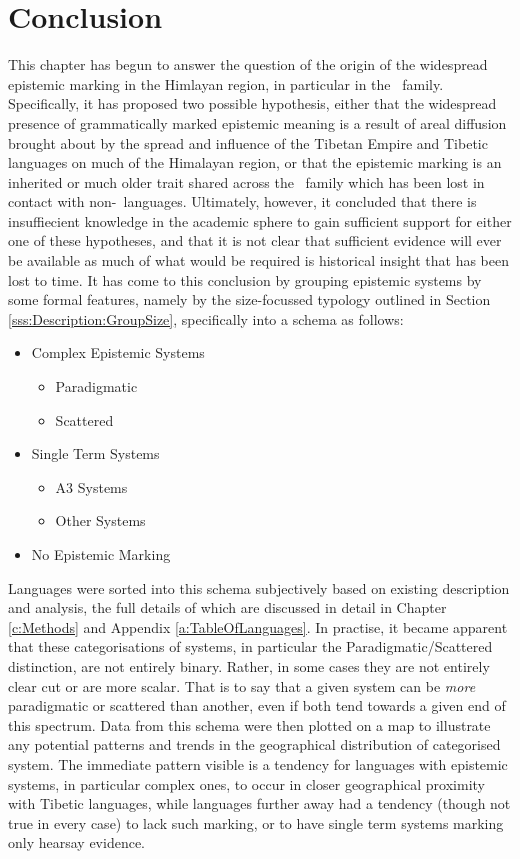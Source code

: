 \section{Conclusion}
This chapter has begun to answer the question of the origin of the widespread epistemic marking in the Himlayan region, in particular in the \lfam\ family. Specifically, it has proposed two possible hypothesis, either that the widespread presence of grammatically marked epistemic meaning is a result of areal diffusion brought about by the spread and influence of the Tibetan Empire and Tibetic languages on much of the Himalayan region, or that the epistemic marking is an inherited or much older trait shared across the \lfam\ family which has been lost in contact with non-\lfam\ languages. Ultimately, however, it concluded that there is insuffiecient knowledge in the academic sphere to gain sufficient support for either one of these hypotheses, and that it is not clear that sufficient evidence will ever be available as much of what would be required is historical insight that has been lost to time.
It has come to this conclusion by grouping epistemic systems by some formal features, namely by the size-focussed typology outlined in Section \ref{sss:Description:GroupSize}, specifically into a schema as follows:
\begin{itemize}
    \item Complex Epistemic Systems
    \begin{itemize}
        \item Paradigmatic
        \item Scattered
    \end{itemize}
    \item Single Term Systems
    \begin{itemize}
        \item A3 Systems
        \item Other Systems
    \end{itemize}
    \item No Epistemic Marking
\end{itemize}
Languages were sorted into this schema subjectively based on existing description and analysis, the full details of which are discussed in detail in Chapter \ref{c:Methods} and Appendix \ref{a:TableOfLanguages}. In practise, it became apparent that these categorisations of systems, in particular the Paradigmatic/Scattered distinction, are not entirely binary. Rather, in some cases they are not entirely clear cut or are more scalar. That is to say that a given system can be \textit{more} paradigmatic or scattered than another, even if both tend towards a given end of this spectrum. Data from this schema were then plotted on a map to illustrate any potential patterns and trends in the geographical distribution of categorised system. The immediate pattern visible is a tendency for languages with epistemic systems, in particular complex ones, to occur in closer geographical proximity with Tibetic languages, while languages further away had a tendency (though not true in every case) to lack such marking, or to have single term systems marking only hearsay evidence.


